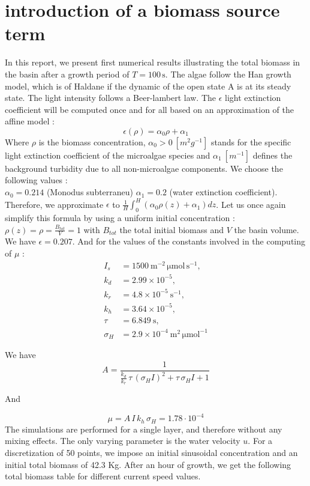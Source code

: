 \documentclass{article}
\begin{document}
\section{introduction of a biomass source term}

In this report, we present first numerical results illustrating the total biomass in the basin after a growth period of $T = 100\,\mathrm{s}$. 
The algae follow the Han growth model, which is of Haldane if the dynamic of the open state A is at its steady state.
The light intensity follows a Beer-lambert law. The $\epsilon$ light extinction coefficient will be computed once and for all based on an approximation of the affine model : 
\[\epsilon(\rho) = \alpha_0\rho + \alpha_1\]
Where $\rho$ is the biomass concentration, $\alpha_0 > 0 \ [m^2g^{-1}]$ stands for the specific light extinction coefficient of the microalgae species
and $\alpha_1 \ [m^{-1}]$ defines the background turbidity due to all non-microalgae components. We choose the following values : \\
$\alpha_0 = 0.214$ (Monodus subterraneu)
$\alpha_1 = 0.2$ (water extinction coefficient). \\

Therefore, we approximate $\epsilon$ to $\frac{1}{H}\int_{0}^{H}(\alpha_0\rho(z) + \alpha_1)dz$. Let us once again simplify this formula by using a uniform initial concentration :
$\rho(z) = \rho = \frac{B_{tot}}{V} = 1$ with $B_{tot}$ the total initial biomass and $V$ the basin volume. 
We have $\epsilon = 0.207$.
And for the values of the constants involved in the computing of $\mu$ : \\
\[
\begin{aligned}
I_s &= 1500 \ \mathrm{m^{-2}\,\mu mol\,s^{-1}},\\
k_d &= 2.99 \times 10^{-5},\\
k_r &= 4.8 \times 10^{-5} \ \mathrm{s^{-1}},\\
k_h &= 3.64 \times 10^{-5},\\
\tau &= 6.849 \ \mathrm{s},\\
\sigma_H &= 2.9 \times 10^{-4} \ \mathrm{m^{2}\,\mu mol^{-1}}
\end{aligned}
\]

We have 
\[
A = \frac{1}{\frac{k_d}{k_r}\,\tau\,(\sigma_H I)^2 + \tau\,\sigma_H I + 1}
\]

And 

\[
\mu = A\, I\, k_h\, \sigma_H = 1.78\cdot 10^{-4}
\] 
The simulations are performed for a single layer, and therefore without any mixing effects. 
The only varying parameter is the water velocity $u$. For a discretization of 50 points, we impose an initial sinusoidal concentration and an initial total biomass of 42.3 Kg.
After an hour of growth, we get the following total biomass table for different current speed values.
\end{document}
